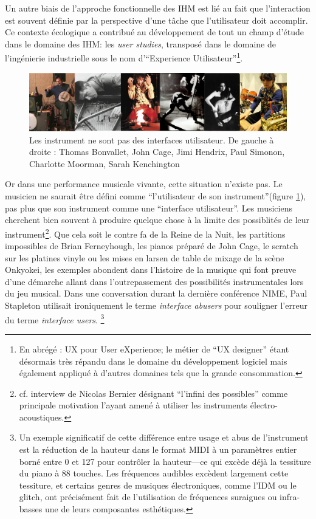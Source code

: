 Un autre biais de l'approche fonctionnelle des \gls{IHM} est lié au fait que l'interaction est souvent définie par la perspective d'une tâche que l'utilisateur doit accomplir. Ce contexte écologique a contribué au développement de tout un champ d'étude dans le domaine des IHM: les \textit{user studies}, transposé dans le domaine de l'ingénierie industrielle sous le nom d'``Experience Utilisateur''\footnote{En abrégé : UX pour User eXperience; le métier de ``UX designer'' étant désormais très répandu dans le domaine du développement logiciel mais également appliqué à d'autres domaines tels que la grande consommation.}.
\begin{figure}[!htbp]
	\captionsetup{format=plain}%
	\includegraphics[width=\textwidth]{gfx/03_gesture/instrumentabusers.png}
	\caption[Les instrument ne sont pas des interfaces utilisateur]{Les instrument ne sont pas des interfaces utilisateur. De gauche à droite : Thomas Bonvallet, John Cage, Jimi Hendrix, Paul Simonon, Charlotte Moorman, Sarah Kenchington}
	\label{fig:gesture:abusers}
\end{figure}
\noindent Or dans une performance musicale vivante, cette situation n'existe pas. Le musicien ne saurait être défini comme ``l'utilisateur de son instrument''(figure \ref{fig:gesture:abusers}), pas plus que son instrument comme une ``interface utilisateur''. Les musiciens cherchent bien souvent à produire quelque chose à la limite des possiblités de leur instrument\footnote{cf. interview de Nicolas Bernier désignant ``l'infini des possibles'' comme principale motivation l'ayant amené à utiliser les instruments électro-acoustiques.}. Que cela soit le contre fa de la Reine de la Nuit, les partitions impossibles de Brian Ferneyhough, les pianos préparé de John Cage, le scratch sur les platines vinyle ou les mises en larsen de table de mixage de la scène Onkyokei, les exemples abondent dans l'histoire de la musique qui font preuve d'une démarche allant dans l'outrepassement des possibilités instrumentales lors du jeu musical. Dans une conversation durant la dernière conférence NIME, Paul Stapleton utilisait ironiquement le terme \textit{interface abusers} pour souligner l'erreur du terme \textit{interface users}. \footnote{Un exemple significatif de cette différence entre usage et abus de l'instrument est la réduction de la hauteur dans le format MIDI à un paramètres entier borné entre 0 et 127 pour contrôler la hauteur—ce qui excède déjà la tessiture du piano à 88 touches. Les fréquences audibles excèdent largement cette tessiture, et certains genres de musiques électroniques, comme l'\gls{IDM} ou le \gls{glitch}, ont précisément fait de l'utilisation de fréquences suraigues ou infra-basses une de leurs composantes esthétiques.}


